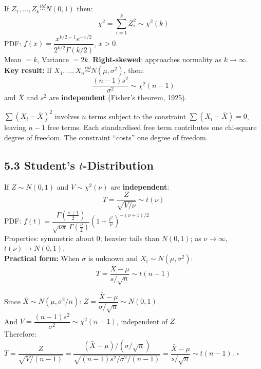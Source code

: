 \documentclass[12pt]{article}
\begin{document}
\begin{defbox}
If $Z_1,\ldots,Z_k\overset{iid}{\sim}N(0,1)$ then:
\[\chi^2=\sum_{i=1}^k Z_i^2\sim\chi^2(k)\]
PDF: $f(x)=\dfrac{x^{k/2-1}e^{-x/2}}{2^{k/2}\Gamma(k/2)}$, $x>0$.\\[6pt]
Mean $=k$, Variance $=2k$. \textbf{Right-skewed}; approaches normality as $k\to\infty$.\\[6pt]
\textbf{Key result:} If $X_1,\ldots,X_n\overset{iid}{\sim}N(\mu,\sigma^2)$, then:
\[\frac{(n-1)s^2}{\sigma^2}\sim\chi^2(n-1)\]
and $\bar X$ and $s^2$ are \textbf{independent} (Fisher's theorem, 1925).
\end{defbox}

\begin{derivbox}
$\sum(X_i-\bar X)^2$ involves $n$ terms subject to the constraint $\sum(X_i-\bar X)=0$, leaving $n-1$ free terms. Each standardised free term contributes one chi-square degree of freedom. The constraint ``costs'' one degree of freedom.
\end{derivbox}

\subsection{5.3 Student's $t$-Distribution}

\begin{defbox}[$t$-Distribution $t(\nu)$]
If $Z\sim N(0,1)$ and $V\sim\chi^2(\nu)$ are \textbf{independent}:
\[T=\frac{Z}{\sqrt{V/\nu}}\sim t(\nu)\]
PDF: $f(t)=\dfrac{\Gamma\!\left(\frac{\nu+1}{2}\right)}{\sqrt{\nu\pi}\,\Gamma\!\left(\frac{\nu}{2}\right)}\!\left(1+\frac{t^2}{\nu}\right)^{-(\nu+1)/2}$\\[6pt]
Properties: symmetric about 0; heavier tails than $N(0,1)$; as $\nu\to\infty$, $t(\nu)\to N(0,1)$.\\[6pt]
\textbf{Practical form:} When $\sigma$ is unknown and $X_i\sim N(\mu,\sigma^2)$:
\[T=\frac{\bar X-\mu}{s/\sqrt{n}}\sim t(n-1)\]
\end{defbox}

\begin{derivbox}
Since $\bar X\sim N(\mu,\sigma^2/n)$: $Z=\dfrac{\bar X-\mu}{\sigma/\sqrt{n}}\sim N(0,1)$.\\
And $V=\dfrac{(n-1)s^2}{\sigma^2}\sim\chi^2(n-1)$, independent of $Z$.\\
Therefore: $T=\dfrac{Z}{\sqrt{V/(n-1)}}=\dfrac{(\bar X-\mu)/(\sigma/\sqrt{n})}{\sqrt{(n-1)s^2/\sigma^2/(n-1)}}=\dfrac{\bar X-\mu}{s/\sqrt{n}}\sim t(n-1)$. \hfill$\square$
\end{derivbox}
\end{document}
